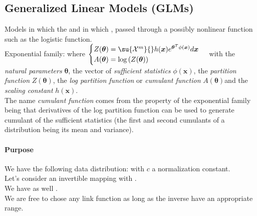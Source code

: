 \subsection{Generalized Linear Models (GLMs)}
Models in which the  and in which , passed through a possibly nonlinear
function such as the logistic function.\\
Exponential family:
where
$\begin{cases}
    Z(\bm{\theta}) = \su{\mathcal{X}^{m}}{}h(\bm{x})e^{\bm{\theta}^{T}\phi(\bm{x})}
    d\bm{x} \\
    A(\bm{\theta}) = \log\left(Z(\bm{\theta})\right)
\end{cases}$
with the \emph{natural parameters} $\bm{\theta}$, the vector of  \emph{sufficient 
statistics} $\phi(\bm{x})$, the \emph{partition function} $Z(\bm{\theta})$, the 
\emph{log partition function} or \emph{cumulant function} $A(\bm{\theta})$and the 
\emph{scaling constant} $h(\bm{x})$.\\
The name \emph{cumulant function} comes from the property of the exponential family 
being that derivatives of the log partition function can be used to generate cumulant
of the sufficient statistics (the first and second cumulants of a distribution being
its mean and variance).
\paragraph{Purpose}
We have the following data distribution:
with $c$ a normalization constant.\\
Let's consider an invertible mapping  with
.\\
We have as well .\\
We are free to chose any link function as long as the inverse have an appropriate 
range. 


